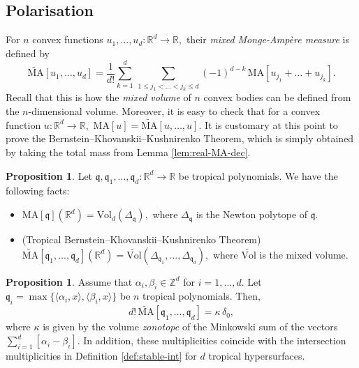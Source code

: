\documentclass[11pt]{amsart}
\theoremstyle{definition}
\newtheorem{proposition}[theorem]{Proposition}
\newcommand{\R}{\mathbb{R}}
\newcommand{\Z}{\mathbb{Z}}
\newcommand{\lto}{\longrightarrow}
\newcommand{\fq}{\mathfrak{q}}
\begin{document}
\subsection{Polarisation}
For $n$ convex functions $u_1, \dots , u_d: \R^d \lto \R,$ their \emph{mixed Monge-Amp\`ere measure} is defined by 
$$
\widetilde{\text{MA}}[u_1, \dots , u_d] = \frac{1}{d!}  \sum_{k=1}^{d} \, \sum_{1 \leq j_1 < \dots < j_k \leq d} (-1)^{d-k} \, {\text{MA}}[u_{j_1}+ \dots + u_{j_k}].
$$
Recall that this is how the \emph{mixed volume} of $n$ convex bodies can be defined from the $n$-dimensional volume. Moreover, it is easy to check that for a convex function $u:\R^d \lto \R,$ $\text{MA}[u] = \widetilde{\text{MA}}[u, \dots , u].$
\vskip 2mm
It is customary at this point to prove the Bernstein--Khovanskii--Kushnirenko Theorem, which is simply obtained by taking the total mass from Lemma \ref{lem:real-MA-dec}.
\begin{proposition}
Let $\fq, \fq_1, \dots , \fq_d:\R^d \lto \R$ be tropical polynomials. We have the following facts:
    \begin{itemize}
        \item [(a)] $\textrm{MA}[\fq](\R^d) = \textrm{Vol}_d (\Delta_{\fq}),$ where $\Delta_{\fq}$ is the Newton polytope of $\fq.$
        \item [(b)] (Tropical Bernstein--Khovanskii--Kushnirenko Theorem) $\widetilde{\text{MA}}[\fq_1, \dots , \fq_d](\R^d) = \widetilde{\text{Vol}} (\Delta_{\fq_1}, \dots , \Delta_{\fq_d}),$ where $\widetilde{\text{Vol}}$ is the mixed volume.    
    \end{itemize}
\end{proposition}
\begin{proposition}\label{cor:int_mult_MA}
    Assume that $\alpha_i, \beta_i \in \Z^d$ for $i=1, \dots , d.$ Let $\fq_i = \max \{ \langle \alpha_i, x \rangle , 
   \langle \beta_i , x \rangle \}$ be $n$ tropical polynomials. Then, 
    $$
    d! \, \widetilde{\text{MA}}[\fq_1, \dots , \fq_d] = \kappa \, \delta_{0},
    $$
    where $\kappa$ is given by the volume \emph{zonotope} of the Minkowski sum of the vectors $\sum_{i=1}^d [ \alpha_i - \beta_i].$ In addition, these multiplicities coincide with the intersection multiplicities in Definition \ref{def:stable-int} for $d$ tropical hypersurfaces. 
 \end{proposition}
    
\end{document}

